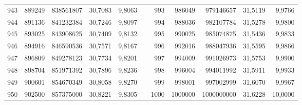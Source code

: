 \begin{longtable}{rrrrrrrrrrr}
943&889249&838561807&30,7083&9,8063&&993&986049&979146657&31,5119&9,9766\\
944&891136&841232384&30,7246&9,8097&&994&988036&982107784&31,5278&9,9800\\
945&893025&843908625&30,7409&9,8132&&995&990025&985074875&31,5436&9,9833\\
946&894916&846590536&30,7571&9,8167&&996&992016&988047936&31,5595&9,9866\\
947&896809&849278123&30,7734&9,8201&&997&994009&991026973&31,5753&9,9900\\
948&898704&851971392&30,7896&9,8236&&998&996004&994011992&31,5911&9,9933\\
949&900601&854670349&30,8058&9,8270&&999&998001&997002999&31,6070&9,9967\\
950&902500&857375000&30,8221&9,8305&&1000&1000000&1000000000&31,6228&10,0000\\
\end{longtable}
